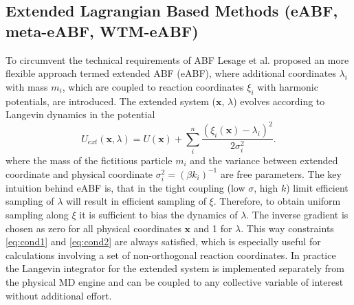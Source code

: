 \newpage
\subsection{Extended Lagrangian Based Methods (eABF, meta-eABF, WTM-eABF)}
\label{sec:eABF}
To circumvent the technical requirements of ABF Lesage et al.\autocite{lesage2017smoothed} proposed an more flexible approach termed extended ABF (eABF), where additional coordinates $\lambda_i$ with mass $m_{i}$, which are coupled to reaction coordinates $\xi_i$ with harmonic potentials, are introduced. The extended system ($\textbf{x}$, $\lambda$) evolves according to Langevin dynamics in the potential
\begin{equation}
  U_{ext}(\textbf{x},\lambda) = U(\textbf{x}) + \sum_i^n \frac{(\xi_{i}(\textbf{x})-\lambda_i)^2}{2\sigma_i^2}.
\end{equation}
where the mass of the fictitious particle $m_i$ and the variance between extended coordinate and physical coordinate $\sigma_i^2=(\beta k_i)^{-1}$ are free parameters.
The key intuition behind eABF is, that in the tight coupling (low $\sigma$, high $k$) limit efficient sampling of $\lambda$ will result in efficient sampling of $\xi$.
Therefore, to obtain uniform sampling along $\xi$ it is sufficient to bias the dynamics of $\lambda$. The inverse gradient is chosen as zero for all physical coordinates $\textbf{x}$ and 1 for $\lambda$.
This way constraints \ref{eq:cond1} and \ref{eq:cond2} are always satisfied, which is especially useful for calculations involving a set of non-orthogonal reaction coordinates.
In practice the Langevin integrator for the extended system is implemented separately from the physical MD engine and can be coupled to any collective variable of interest without additional effort.

